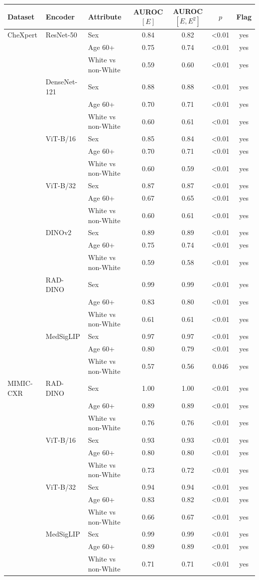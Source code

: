 \begin{tabular}{lllcccc}
\toprule
Dataset & Encoder & Attribute & AUROC $[E]$ & AUROC $[E,E^2]$ & $p$ & Flag \\
\midrule
CheXpert & ResNet-50 & Sex & 0.84 & 0.82 & <0.01 & yes \\
 &  & Age 60+ & 0.75 & 0.74 & <0.01 & yes \\
 &  & White vs non-White & 0.59 & 0.60 & <0.01 & yes \\
\midrule
 & DenseNet-121 & Sex & 0.88 & 0.88 & <0.01 & yes \\
 &  & Age 60+ & 0.70 & 0.71 & <0.01 & yes \\
 &  & White vs non-White & 0.60 & 0.61 & <0.01 & yes \\
\midrule
 & ViT-B/16 & Sex & 0.85 & 0.84 & <0.01 & yes \\
 &  & Age 60+ & 0.70 & 0.71 & <0.01 & yes \\
 &  & White vs non-White & 0.60 & 0.59 & <0.01 & yes \\
\midrule
 & ViT-B/32 & Sex & 0.87 & 0.87 & <0.01 & yes \\
 &  & Age 60+ & 0.67 & 0.65 & <0.01 & yes \\
 &  & White vs non-White & 0.60 & 0.61 & <0.01 & yes \\
\midrule
 & DINOv2 & Sex & 0.89 & 0.89 & <0.01 & yes \\
 &  & Age 60+ & 0.75 & 0.74 & <0.01 & yes \\
 &  & White vs non-White & 0.59 & 0.58 & <0.01 & yes \\
\midrule
 & RAD-DINO & Sex & 0.99 & 0.99 & <0.01 & yes \\
 &  & Age 60+ & 0.83 & 0.80 & <0.01 & yes \\
 &  & White vs non-White & 0.61 & 0.61 & <0.01 & yes \\
\midrule
 & MedSigLIP & Sex & 0.97 & 0.97 & <0.01 & yes \\
 &  & Age 60+ & 0.80 & 0.79 & <0.01 & yes \\
 &  & White vs non-White & 0.57 & 0.56 & 0.046 & yes \\
\midrule
MIMIC-CXR & RAD-DINO & Sex & 1.00 & 1.00 & <0.01 & yes \\
 &  & Age 60+ & 0.89 & 0.89 & <0.01 & yes \\
 &  & White vs non-White & 0.76 & 0.76 & <0.01 & yes \\
\midrule
 & ViT-B/16 & Sex & 0.93 & 0.93 & <0.01 & yes \\
 &  & Age 60+ & 0.80 & 0.80 & <0.01 & yes \\
 &  & White vs non-White & 0.73 & 0.72 & <0.01 & yes \\
\midrule
 & ViT-B/32 & Sex & 0.94 & 0.94 & <0.01 & yes \\
 &  & Age 60+ & 0.83 & 0.82 & <0.01 & yes \\
 &  & White vs non-White & 0.66 & 0.67 & <0.01 & yes \\
\midrule
 & MedSigLIP & Sex & 0.99 & 0.99 & <0.01 & yes \\
 &  & Age 60+ & 0.89 & 0.89 & <0.01 & yes \\
 &  & White vs non-White & 0.71 & 0.71 & <0.01 & yes \\
\bottomrule
\end{tabular}
